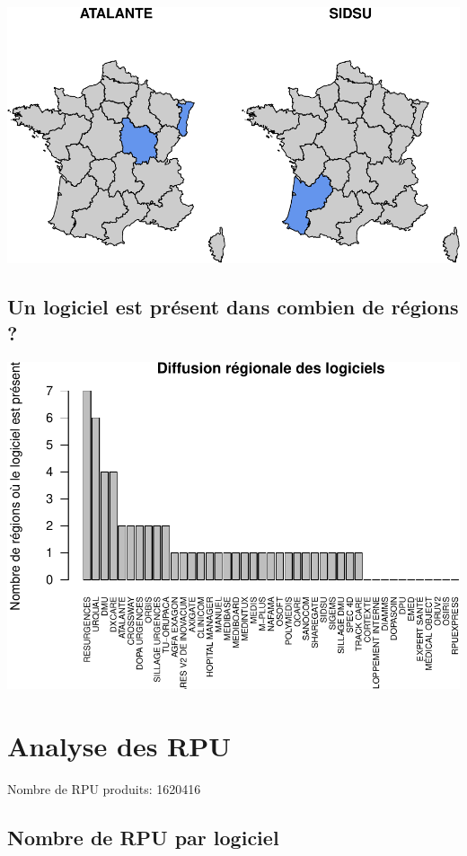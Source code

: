 \documentclass[]{article}
\begin{document}
\includegraphics{septembre2015_files/figure-latex/unnamed-chunk-8-4.pdf}

\subsection{Un logiciel est présent dans combien de régions
?}\label{un-logiciel-est-present-dans-combien-de-regions}

\includegraphics{septembre2015_files/figure-latex/unnamed-chunk-9-1.pdf}

\section{Analyse des RPU}\label{analyse-des-rpu}

Nombre de RPU produits: 1620416

\subsection{Nombre de RPU par
logiciel}\label{nombre-de-rpu-par-logiciel}
\end{document}
